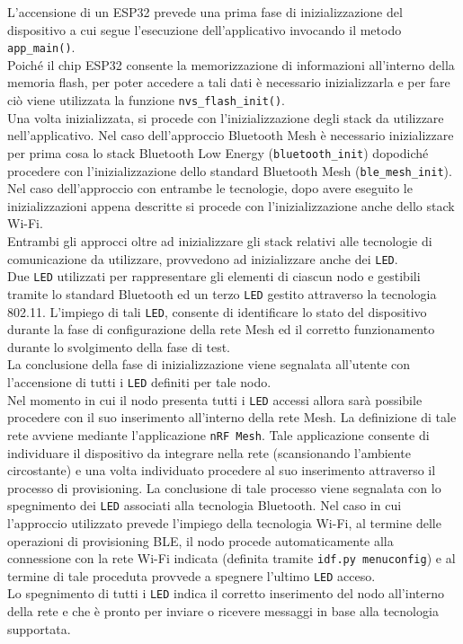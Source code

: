 \noindent L'accensione di un ESP32 prevede una prima fase di inizializzazione del dispositivo a cui segue l'esecuzione dell'applicativo invocando il metodo \texttt{app\_main()}.\\
Poiché il chip ESP32 consente la memorizzazione di informazioni all'interno della memoria flash, per poter accedere a tali dati è necessario inizializzarla e per fare ciò viene utilizzata la funzione \texttt{nvs\_flash\_init()}.\\
Una volta inizializzata, si procede con l'inizializzazione degli stack da utilizzare nell'applicativo. Nel caso dell'approccio Bluetooth Mesh è necessario inizializzare per prima cosa lo stack Bluetooth Low Energy (\texttt{bluetooth\_init}) dopodiché procedere con l'inizializzazione dello standard Bluetooth Mesh (\texttt{ble\_mesh\_init}). Nel caso dell'approccio con entrambe le tecnologie, dopo avere eseguito le inizializzazioni appena descritte si procede con l'inizializzazione anche dello stack Wi-Fi.\\
Entrambi gli approcci oltre ad inizializzare gli stack relativi alle tecnologie di comunicazione da utilizzare, provvedono ad inizializzare anche dei \texttt{LED}. \\
Due \texttt{LED} utilizzati per rappresentare gli elementi di ciascun nodo e gestibili tramite lo standard Bluetooth ed un terzo \texttt{LED} gestito attraverso la tecnologia 802.11. L'impiego di tali \texttt{LED}, consente di identificare lo stato del dispositivo durante la fase di configurazione della rete Mesh ed il corretto funzionamento durante lo svolgimento della fase di test.\\
La conclusione della fase di inizializzazione viene segnalata all'utente con l'accensione di tutti i \texttt{LED} definiti per tale nodo.\\
Nel momento in cui il nodo presenta tutti i \texttt{LED} accessi allora sarà possibile procedere con il suo inserimento all'interno della rete Mesh. La definizione di tale rete avviene mediante l'applicazione \texttt{nRF Mesh}. Tale applicazione consente di individuare il dispositivo da integrare nella rete (scansionando l'ambiente circostante) e una volta individuato procedere al suo inserimento attraverso il processo di provisioning. La conclusione di tale processo viene segnalata con lo spegnimento dei \texttt{LED} associati alla tecnologia Bluetooth. Nel caso in cui l'approccio utilizzato prevede l'impiego della tecnologia Wi-Fi, al termine delle operazioni di provisioning BLE, il nodo procede automaticamente alla connessione con la rete Wi-Fi indicata (definita tramite \texttt{idf.py menuconfig}) e al termine di tale proceduta provvede a spegnere l'ultimo \texttt{LED} acceso.\\
Lo spegnimento di tutti i \texttt{LED} indica il corretto inserimento del nodo all'interno della rete e che è pronto per inviare o ricevere messaggi in base alla tecnologia supportata.\\

